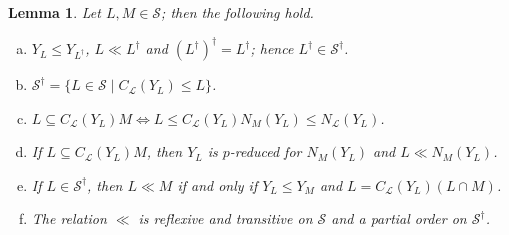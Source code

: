 \documentclass{amsart}
\numberwithin{equation}{section}
\newtheorem{lemma}[equation]{Lemma}
\theoremstyle{definition}
\theoremstyle{subresult}
\theoremstyle{caseresult}
\renewcommand{\L}{\mathcal{L}}
\renewcommand{\S}{\mathcal{S}}
\newcommand{\<}{\langle}
\renewcommand{\>}{\rangle}
\begin{document}
\begin{lemma}\label{lemma:partial order for the main reduction}
    Let $L,M \in \S$; then the following hold.
    \begin{enumerate}[(a)]
        \item $Y_L \le Y_{L^\dagger}$, $L \ll L^\dagger$ and $(L^\dagger)^\dagger = L^\dagger$; hence $L^\dagger \in \S^\dagger$.
        \item $\S^\dagger = \{L \in \S \mid C_\L(Y_L) \le L \}$.
        \item $L \subseteq C_\L(Y_L) M \iff L \le C_\L(Y_L)N_M(Y_L) \le N_\L(Y_L)$.
        \item If $L \subseteq C_\L(Y_L)M$, then $Y_L$ is $p$-reduced for $N_M(Y_L)$ and $L \ll N_M(Y_L)$.
        \item If $L \in \S^\dagger$, then $L \ll M$ if and only if $Y_L \le Y_M$ and $L = C_\L(Y_L)(L \cap M)$.
        \item The relation $\ll$ is reflexive and transitive on $\S$ and a partial order on $\S^\dagger$.
    \end{enumerate}
\end{lemma}
\end{document}
